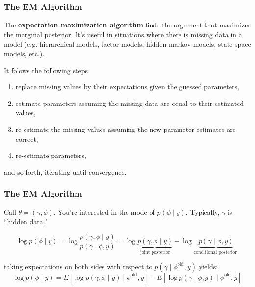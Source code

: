 \documentclass{beamer}
\begin{document}
\begin{frame}
\frametitle{The EM Algorithm}

The {\bf expectation-maximization algorithm} finds the argument that maximizes the marginal posterior. It's useful in situations where there is missing data in a model (e.g. hierarchical models, factor models, hidden markov models, state space models, etc.). 
\newline

It folows the following steps
\begin{enumerate}
\item replace missing values by their expectations given the guessed parameters, 
\item estimate parameters assuming the missing data are equal to their estimated values, 
\item re-estimate the missing values assuming the new parameter estimates are correct,
\item re-estimate parameters, 
\end{enumerate}
and so forth, iterating until convergence.

\end{frame}


\begin{frame}[fragile]
\frametitle{The EM Algorithm}

Call $\theta = (\gamma, \phi)$. You're interested in the mode of $p(\phi \mid y)$. Typically, $\gamma$ is ``hidden data."
\newline

$$
\log p(\phi \mid y) = \log \frac{p(\gamma, \phi \mid y)}{p(\gamma \mid \phi, y)} = \log \underbrace{p(\gamma, \phi \mid y)}_{ \text{joint posterior} } - \log \underbrace{p(\gamma \mid \phi, y)}_{\text{conditional posterior }}
$$
\pause

taking expectations on both sides with respect to $p(\gamma \mid \phi^{\text{old}}, y)$ yields:
$$
\log p(\phi \mid y) =  E\left[ \log p(\gamma, \phi \mid y) \mid \phi^{\text{old}}, y \right] - E\left[\log p(\gamma \mid \phi, y) \mid \phi^{\text{old}}, y \right]
$$




\end{frame}
\end{document}
